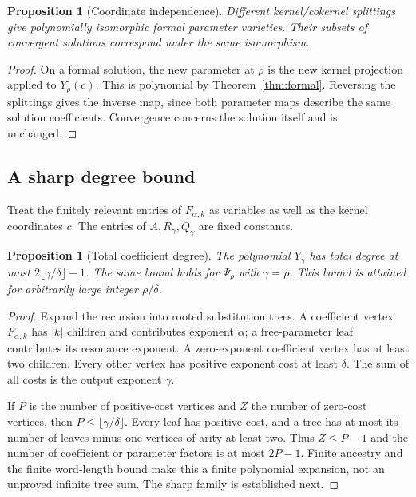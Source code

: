 \documentclass[11pt,a4paper]{article}
\numberwithin{equation}{section}
\newtheorem{proposition}[theorem]{Proposition}
\theoremstyle{definition}
\theoremstyle{remark}
\begin{document}
\begin{proposition}[Coordinate independence]\label{prop:intrinsic}
Different kernel/cokernel splittings give polynomially isomorphic formal
parameter varieties. Their subsets of convergent solutions correspond
under the same isomorphism.
\end{proposition}
\begin{proof}
On a formal solution, the new parameter at $\rho$ is the new kernel
projection applied to $Y_\rho(c)$. This is polynomial by
Theorem~\ref{thm:formal}. Reversing the splittings gives the inverse map,
since both parameter maps describe the same solution coefficients.
Convergence concerns the solution itself and is unchanged.
\end{proof}

\subsection{A sharp degree bound}
Treat the finitely relevant entries of $F_{\alpha,k}$ as variables as well
as the kernel coordinates $c$. The entries of $A,R_\gamma,Q_\gamma$ are
fixed constants.

\begin{proposition}[Total coefficient degree]\label{prop:degree}
The polynomial $Y_\gamma$ has total degree at most
$2\lfloor\gamma/\delta\rfloor-1$. The same bound holds for
$\Psi_\rho$ with $\gamma=\rho$. This bound is attained for arbitrarily
large integer $\rho/\delta$.
\end{proposition}
\begin{proof}
Expand the recursion into rooted substitution trees. A coefficient vertex
$F_{\alpha,k}$ has $|k|$ children and contributes exponent $\alpha$; a
free-parameter leaf contributes its resonance exponent. A zero-exponent
coefficient vertex has at least two children. Every other vertex has
positive exponent cost at least $\delta$. The sum of all costs is the
output exponent $\gamma$.

If $P$ is the number of positive-cost vertices and $Z$ the number of
zero-cost vertices, then $P\leq\lfloor\gamma/\delta\rfloor$.
Every leaf has positive cost, and a tree has at most its number of leaves
minus one vertices of arity at least two. Thus $Z\leq P-1$ and the number
of coefficient or parameter factors is at most $2P-1$.
Finite ancestry and the finite word-length bound make this a finite
polynomial expansion, not an unproved infinite tree sum.
The sharp family is established next.
\end{proof}
\end{document}

